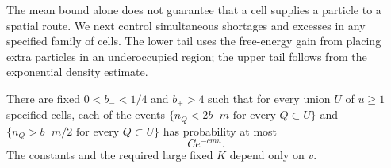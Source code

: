 The mean bound alone does not guarantee that a cell supplies a particle
to a spatial route. We next control simultaneous shortages and excesses
in any specified family of cells. The lower tail uses the free-energy
gain from placing extra particles in an underoccupied region; the upper
tail follows from the exponential density estimate.

\begin{lemma}\label{lem:occupation-tails}
There are fixed $0<b_-<1/4$ and $b_+>4$ such that for every union
$U$ of $u\geq1$ specified cells, each of the events
$\{n_Q<2b_-m\text{ for every }Q\subset U\}$ and
$\{n_Q>b_+m/2\text{ for every }Q\subset U\}$ has probability at most
\begin{equation}
 C e^{-cmu}.\tag{12}\label{eq:12}
\end{equation}
The constants and the required large fixed $K$ depend only on $v$.
\end{lemma}

